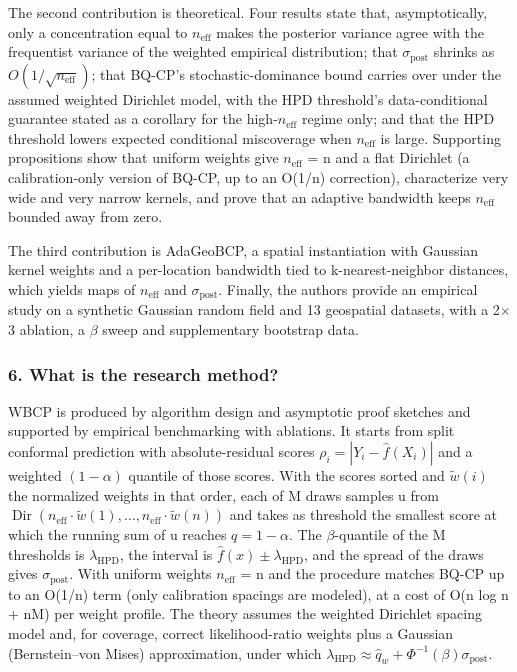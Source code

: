 \documentclass[11pt]{article}
\newcommand{\question}[1]{\subsubsection*{#1}}
\begin{document}
The second contribution is theoretical. Four results state that, asymptotically, only a concentration equal to $n_{\mathrm{eff}}$ makes the posterior variance agree with the frequentist variance of the weighted empirical distribution; that $\sigma_{\mathrm{post}}$ shrinks as $O(1/\sqrt{n_{\mathrm{eff}}})$; that BQ-CP's stochastic-dominance bound carries over under the assumed weighted Dirichlet model, with the HPD threshold's data-conditional guarantee stated as a corollary for the high-$n_{\mathrm{eff}}$ regime only; and that the HPD threshold lowers expected conditional miscoverage when $n_{\mathrm{eff}}$ is large. Supporting propositions show that uniform weights give $n_{\mathrm{eff}}$ = n and a flat Dirichlet (a calibration-only version of BQ-CP, up to an O(1/n) correction), characterize very wide and very narrow kernels, and prove that an adaptive bandwidth keeps $n_{\mathrm{eff}}$ bounded away from zero.

The third contribution is AdaGeoBCP, a spatial instantiation with Gaussian kernel weights and a per-location bandwidth tied to k-nearest-neighbor distances, which yields maps of $n_{\mathrm{eff}}$ and $\sigma_{\mathrm{post}}$. Finally, the authors provide an empirical study on a synthetic Gaussian random field and 13 geospatial datasets, with a 2\ensuremath{\times}3 ablation, a \ensuremath{\beta} sweep and supplementary bootstrap data.

\question{6. What is the research method?}

WBCP is produced by algorithm design and asymptotic proof sketches and supported by empirical benchmarking with ablations. It starts from split conformal prediction with absolute-residual scores $\rho_i = |Y_i - \hat{f}(X_i)|$ and a weighted $(1 - \alpha)$ quantile of those scores. With the scores sorted and $\tilde{w}(i)$ the normalized weights in that order, each of M draws samples u from $\operatorname{Dir}(n_{\mathrm{eff}} \cdot \tilde{w}(1), \ldots, n_{\mathrm{eff}} \cdot \tilde{w}(n))$ and takes as threshold the smallest score at which the running sum of u reaches $q = 1 - \alpha$. The \ensuremath{\beta}-quantile of the M thresholds is $\lambda_{\mathrm{HPD}}$, the interval is $\hat{f}(x) \pm \lambda_{\mathrm{HPD}}$, and the spread of the draws gives $\sigma_{\mathrm{post}}$. With uniform weights $n_{\mathrm{eff}}$ = n and the procedure matches BQ-CP up to an O(1/n) term (only calibration spacings are modeled), at a cost of O(n log n + nM) per weight profile. The theory assumes the weighted Dirichlet spacing model and, for coverage, correct likelihood-ratio weights plus a Gaussian (Bernstein--von Mises) approximation, under which $\lambda_{\mathrm{HPD}} \approx \hat{q}_w + \Phi^{-1}(\beta)\sigma_{\mathrm{post}}$.
\end{document}

